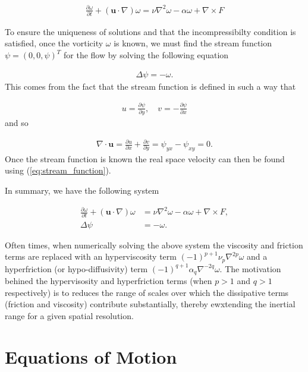\documentclass[9pt]{article}
\newcommand{\pder}[2]{\frac{\partial #1}{\partial #2}}               %
\newcommand{\curl}[1]{\nabla \times {#1}}								%
\newcommand{\bfu}{\mathbf{u}}											%
\begin{document}
\begin{align}
	\pder{\omega}{t} + \left(\bfu \cdot \nabla\right)\omega = \nu \nabla^2 \omega  - \alpha \omega +  \curl{F}
\end{align}

To ensure the uniqueness of solutions and that the incompressibilty condition is satisfied, once the vorticity $\omega$ is known, we must find the stream function $\psi = (0, 0, \psi)^T$ for the flow by solving the following equation

\begin{align}
	\Delta\psi = -\omega.
\end{align}
This comes from the fact that the stream function is defined in such a way that 

\begin{align}
	u = \pder{\psi}{y}, \quad v = -\pder{\psi}{x}
	\label{eq:stream_function}
\end{align}
and so

\begin{align}
\nabla \cdot \bfu = \pder{u}{x} + \pder{v}{y} = \psi_{y x}-\psi_{x y}=0.
\end{align}
Once the stream function is known the real space velocity can then be found using (\ref{eq:stream_function}).

In summary, we have the following system

\begin{align}
	\pder{\omega}{t} + \left(\bfu \cdot \nabla\right)\omega &=\nu \nabla^2\omega -\alpha \omega +  \curl{F}, \label{eq:vort_eq}\\
	\Delta\psi &= -\omega. \label{eq:laplace}
\end{align}

Often times, when numerically solving the above system the viscosity and friction terms are replaced with an hyperviscosity term $(-1)^{p + 1}\nu_p \nabla^{2p}\omega$ and a hyperfriction (or hypo-diffusivity) term $(-1)^{q + 1}\alpha_q \nabla^{-2q}\omega$. The motivation behined the hypervisosity and hyperfriction terms (when $p > 1$ and $q > 1$ respectively) is to reduces the range of scales over which the dissipative terms (friction and viscosity) contribute substantially, thereby ewxtending the inertial range for a given spatial resolution.

\section{Equations of Motion}
\end{document}
